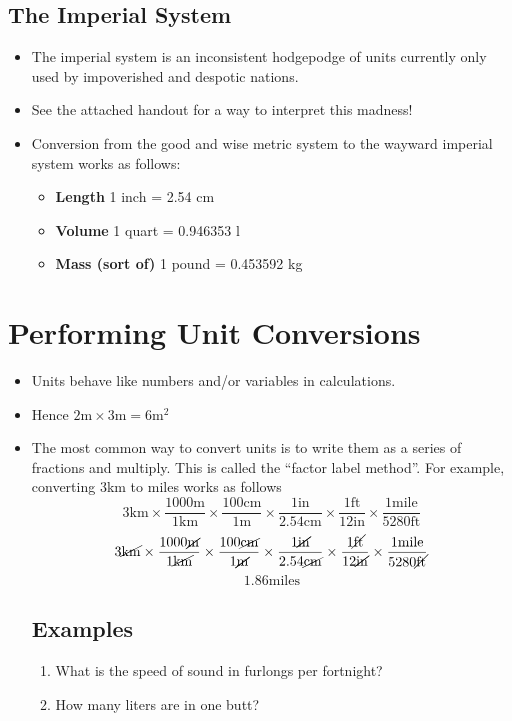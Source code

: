 \documentclass{article}
\begin{document}
\subsection*{The Imperial System}
\begin{itemize}
\item The imperial system is an inconsistent hodgepodge of units 
currently only used by impoverished and despotic nations.
\item See the attached handout for a way to interpret this madness!
\item Conversion from the good and wise metric system to the wayward
imperial system works as follows:
\begin{itemize}
\item {\bf Length} 1 inch = 2.54 cm
\item {\bf Volume} 1 quart = 0.946353 l
\item {\bf Mass (sort of)} 1 pound = 0.453592 kg
\end{itemize}
\end{itemize}

\section*{Performing Unit Conversions}
\begin{itemize}
\item Units behave like numbers and/or variables in calculations.
\item Hence $2\mathrm{m} \times 3 \mathrm{m} = 6\mathrm{m}^2$
\item The most common way to convert units is to write them as a series of fractions and multiply.
This is called the ``factor label method''.  For example, converting 3km to miles works as follows
\newline
\[
3\mathrm{km} \times \dfrac{1000\mathrm{m}}{1\mathrm{km}} \times \dfrac{100\mathrm{cm}}{1\mathrm{m}} \times \dfrac{1\mathrm{in}}{2.54\mathrm{cm}} \times \dfrac{1 \mathrm{ft}}{12\mathrm{in}}\times \dfrac{1\mathrm{mile}}{5280\mathrm{ft}}
\]
\[
	3\cancel{\mathrm{km}} \times \dfrac{1000\cancel{\mathrm{m}}}{1\cancel{\mathrm{km}}} \times \dfrac{100\cancel{\mathrm{cm}}}{1\cancel{\mathrm{m}}} \times \dfrac{1\cancel{\mathrm{in}}}{2.54\cancel{\mathrm{cm}}} \times \dfrac{1 \cancel{\mathrm{ft}}}{12\cancel{\mathrm{in}}}\times \dfrac{1\mathrm{mile}}{5280\cancel{\mathrm{ft}}}
\]
\[
1.86\mathrm{miles}
\]

\subsection*{Examples}
\begin{enumerate}
\item What is the speed of sound in furlongs per fortnight?
\item How many liters are in one butt?
\end{enumerate}
\end{itemize}
\end{document}
